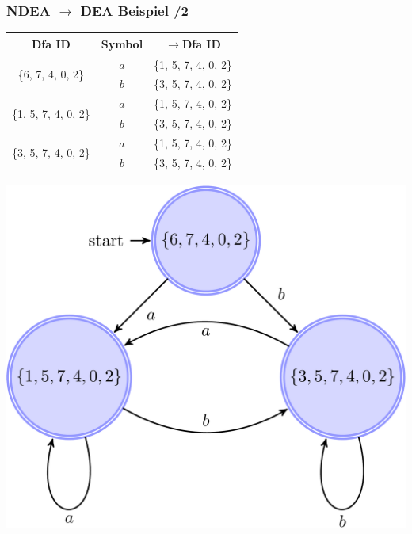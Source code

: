 \documentclass[ignorenonframetext]{beamer}
\begin{document}
\begin{frame}[plain]

\begin{center}
    \frametitle{NDEA $\rightarrow$ DEA Beispiel /2}
    
    \begin{tabular}{c|c|c}
        Dfa ID & Symbol & $\rightarrow$Dfa ID\\
        \hline
        \multirow{2}{*}{\{6, 7, 4, 0, 2\}}   & $a$ & \{1, 5, 7, 4, 0, 2\} \\
                            & $b$ & \{3, 5, 7, 4, 0, 2\} \\
        \hline
        \multirow{2}{*}{\{1, 5, 7, 4, 0, 2\}} & $a$ & \{1, 5, 7, 4, 0, 2\}\\
                             & $b$ & \{3, 5, 7, 4, 0, 2\}\\
        \hline
         \multirow{2}{*}{\{3, 5, 7, 4, 0, 2\}}& $a$ & \{1, 5, 7, 4, 0, 2\}\\
                             & $b$ &  \{3, 5, 7, 4, 0, 2\}\\
    \end{tabular} 
\end{center}

\begin{center}
    \includegraphics[scale=.175]{aorbstar.pdf}
\end{center}

\end{frame}
\end{document}
